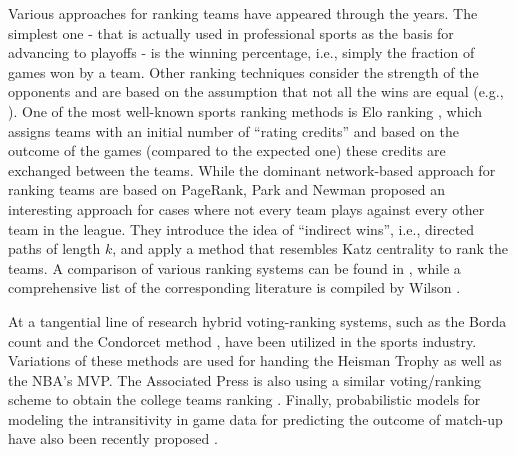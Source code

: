 Various approaches for ranking teams have appeared through the years.  
The simplest one - that is actually used in professional sports as the basis for advancing to playoffs - is the winning percentage, i.e., simply the fraction of games won by a team.  
Other ranking techniques consider the strength of the opponents and are based on the assumption that not all the wins are equal (e.g., \cite{rpi1}).  
One of the most well-known sports ranking methods is Elo ranking \cite{elo1978rating}, which assigns teams with an initial number of ``rating credits'' and based on the outcome of the games (compared to the expected one) these credits are exchanged between the teams.  
While the dominant network-based approach for ranking teams are based on PageRank, Park and Newman \cite{park2005network} proposed an interesting approach for cases where not every team plays against every other team in the league.  
They introduce the idea of ``indirect wins'', i.e., directed paths of length $k$, and apply a method that resembles Katz centrality to rank the teams.  
A comparison of various ranking systems can be found in \cite{barrow13,chartier11}, while a comprehensive list of the corresponding literature is compiled by Wilson \cite{wilson}.

At a tangential line of research hybrid voting-ranking systems, such as the Borda count and the Condorcet method \cite{stahl06}, have been utilized in the sports industry.  
Variations of these methods are used for handing the Heisman Trophy as well as the NBA's MVP. %
The Associated Press is also using a similar voting/ranking scheme to obtain the college teams ranking \cite{ap-ncaa}.  
Finally, probabilistic models for modeling the intransitivity in game data for predicting the outcome of match-up have also been recently proposed \cite{chen2016modeling,chen2016kdd}.